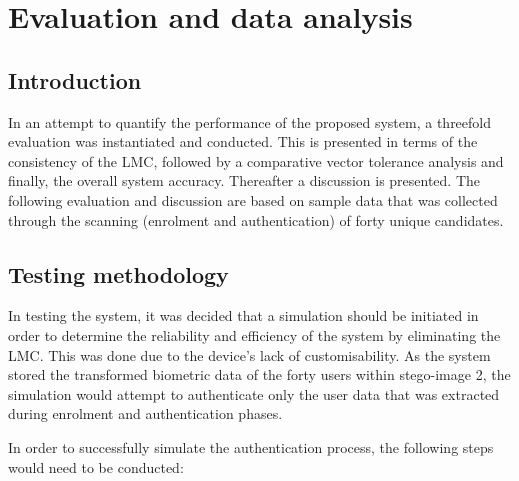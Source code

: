 \chapter{Evaluation and data analysis}


\section{Introduction}

In an attempt to quantify the performance of the proposed system, a threefold evaluation was instantiated and conducted. This is presented in terms of the consistency of the LMC, followed by a comparative vector tolerance analysis and finally, the overall system accuracy. Thereafter a discussion is presented. The following evaluation and discussion are based on sample data that was collected through the scanning (enrolment and authentication) of forty unique candidates.

\section{Testing methodology}


In testing the system, it was decided that a simulation should be initiated in order to determine the reliability and efficiency of the system by eliminating the LMC. This was done due to the device's lack of customisability. As the system stored the transformed biometric data of the forty users within stego-image 2, the simulation would attempt to authenticate only the user data that was extracted during enrolment and authentication phases. 

In order to successfully simulate the authentication process, the following steps would need to be conducted: 

